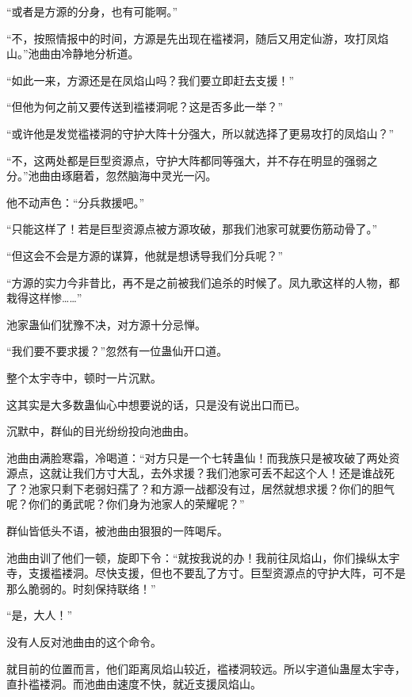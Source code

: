 \begin{this_body}
“或者是方源的分身，也有可能啊。”

“不，按照情报中的时间，方源是先出现在褴褛洞，随后又用定仙游，攻打凤焰山。”池曲由冷静地分析道。

“如此一来，方源还是在凤焰山吗？我们要立即赶去支援！”

“但他为何之前又要传送到褴褛洞呢？这是否多此一举？”

“或许他是发觉褴褛洞的守护大阵十分强大，所以就选择了更易攻打的凤焰山？”

“不，这两处都是巨型资源点，守护大阵都同等强大，并不存在明显的强弱之分。”池曲由琢磨着，忽然脑海中灵光一闪。

他不动声色：“分兵救援吧。”

“只能这样了！若是巨型资源点被方源攻破，那我们池家可就要伤筋动骨了。”

“但这会不会是方源的谋算，他就是想诱导我们分兵呢？”

“方源的实力今非昔比，再不是之前被我们追杀的时候了。凤九歌这样的人物，都栽得这样惨……”

池家蛊仙们犹豫不决，对方源十分忌惮。

“我们要不要求援？”忽然有一位蛊仙开口道。

整个太宇寺中，顿时一片沉默。

这其实是大多数蛊仙心中想要说的话，只是没有说出口而已。

沉默中，群仙的目光纷纷投向池曲由。

池曲由满脸寒霜，冷喝道：“对方只是一个七转蛊仙！而我族只是被攻破了两处资源点，这就让我们方寸大乱，去外求援？我们池家可丢不起这个人！还是谁战死了？池家只剩下老弱妇孺了？和方源一战都没有过，居然就想求援？你们的胆气呢？你们的勇武呢？你们身为池家人的荣耀呢？”

群仙皆低头不语，被池曲由狠狠的一阵喝斥。

池曲由训了他们一顿，旋即下令：“就按我说的办！我前往凤焰山，你们操纵太宇寺，支援褴褛洞。尽快支援，但也不要乱了方寸。巨型资源点的守护大阵，可不是那么脆弱的。时刻保持联络！”

“是，大人！”

没有人反对池曲由的这个命令。

就目前的位置而言，他们距离凤焰山较近，褴褛洞较远。所以宇道仙蛊屋太宇寺，直扑褴褛洞。而池曲由速度不快，就近支援凤焰山。

\end{this_body}

